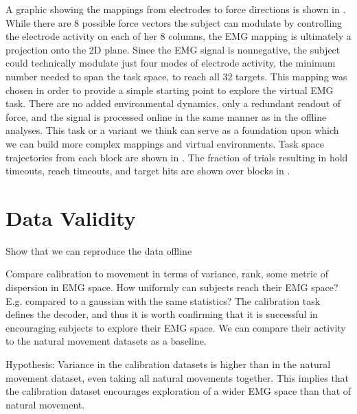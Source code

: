 \documentclass[../main.tex]{subfiles}
\begin{document}
A graphic showing the mappings from electrodes to force directions is shown in . While there are 8 possible force vectors the subject can modulate by controlling the electrode activity on each of her 8 columns, the EMG mapping is ultimately a projection onto the 2D plane. Since the EMG signal is nonnegative, the subject could technically modulate just four modes of electrode activity, the minimum number needed to span the task space, to reach all 32 targets. This mapping was chosen in order to provide a simple starting point to explore the virtual EMG task. There are no added environmental dynamics, only a redundant readout of force, and the signal is processed online in the same manner as in the offline analyses. This task or a variant we think can serve as a foundation upon which we can build more complex mappings and virtual environments. Task space trajectories from each block are shown in . The fraction of trials resulting in hold timeouts, reach timeouts, and target hits are shown over blocks in .



\section{Data Validity}

Show that we can reproduce the data offline

Compare calibration to movement in terms of variance, rank, some metric of dispersion in EMG space.
How uniformly can subjects reach their EMG space? E.g. compared to a gaussian with the same statistics?
The calibration task defines the decoder, and thus it is worth confirming that it is successful in encouraging subjects to explore their EMG space. We can compare their activity to the natural movement datasets as a baseline.

Hypothesis: Variance in the calibration datasets is higher than in the natural movement dataset, even taking all natural movements together. This implies that the calibration dataset encourages exploration of a wider EMG space than that of natural movement.
\end{document}
